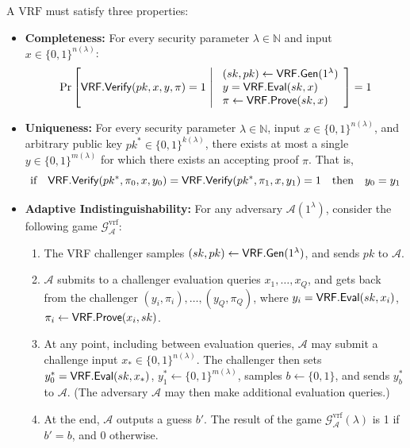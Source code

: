 A $\mathrm{VRF}$ must satisfy three properties:
\begin{itemize}
    \item \textbf{Completeness:} For every security parameter $\lambda \in \mathbb{N}$ and input $x \in \{0,1\}^{n(\lambda)}$:
    \[
    \Pr\left[ \VRFVerify(pk,x, y, \pi) = 1 \ \middle| \ 
    \begin{array}{l}
        (sk, pk) \leftarrow \VRFGen(1^\lambda) \\
        y = \VRFEval(sk,x) \\
        \pi \leftarrow \VRFProve(sk,x)
    \end{array}
    \right] = 1
    \]
    
    \item \textbf{Uniqueness:} For every security parameter $\lambda \in \mathbb{N}$, input $x \in \{0,1\}^{n(\lambda)}$, and arbitrary public key $pk^* \in \{0,1\}^{k(\lambda)}$, there exists at most a single $y \in \{0,1\}^{m(\lambda)}$ for which there exists an accepting proof $\pi$. That is,
    \[
    \text{if} \quad \mathsf{VRF.Verify}(pk^*, \pi_0, x, y_0) = \mathsf{VRF.Verify}(pk^*, \pi_1, x, y_1) = 1 \quad \text{then} \quad y_0 = y_1
    \]
    
    \item \textbf{Adaptive Indistinguishability:} For any adversary $\mathcal{A}(1^\lambda)$, consider the following game $\mathcal{G}_{\mathcal{A}}^{\text{vrf}}$:
    \begin{enumerate}
        \item The VRF challenger samples $(sk, pk) \leftarrow \mathsf{VRF.Gen}(1^\lambda)$, and sends $pk$ to $\mathcal{A}$.
        \item $\mathcal{A}$ submits to a challenger evaluation queries $x_1, \ldots, x_Q$, and gets back from the challenger $(y_i, \pi_i), \ldots, (y_Q, \pi_Q)$, where $y_i = \mathsf{VRF.Eval}(sk, x_i)$, $\pi_i \leftarrow \mathsf{VRF.Prove}(x_i, sk)$.
        \item At any point, including between evaluation queries, $\mathcal{A}$ may submit a challenge input $x_* \in \{0,1\}^{n(\lambda)}$. The challenger then sets $y_0^* = \mathsf{VRF.Eval}(sk, x_*)$, $y_1^* \leftarrow \{0,1\}^{m(\lambda)}$, samples $b \leftarrow \{0,1\}$, and sends $y_b^*$ to $\mathcal{A}$. (The adversary $\mathcal{A}$ may then make additional evaluation queries.)
        \item At the end, $\mathcal{A}$ outputs a guess $b'$. The result of the game $\mathcal{G}_{\mathcal{A}}^{\text{vrf}}(\lambda)$ is 1 if $b' = b$, and 0 otherwise.
    \end{enumerate}
    

\end{itemize}
